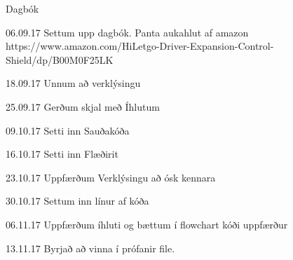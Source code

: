 Dagbók

06.09.17
Settum upp dagbók. Panta aukahlut af amazon https://www.amazon.com/HiLetgo-Driver-Expansion-Control-Shield/dp/B00M0F25LK

18.09.17
Unnum að verklýsingu

25.09.17
Gerðum skjal með Íhlutum

09.10.17
Setti inn Sauðakóða

16.10.17
Setti inn Flæðirit

23.10.17
Uppfærðum Verklýsingu að ósk kennara

30.10.17
Settum inn línur af kóða

06.11.17
Uppfærðum íhluti og bættum í flowchart
kóði uppfærður

13.11.17
Byrjað að vinna í prófanir file. 
